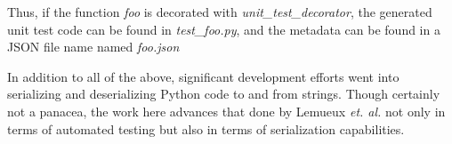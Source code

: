 Thus, if the function \textit{foo} is decorated with \textit{unit\_test\_decorator},
the generated unit test code can be found in \textit{test\_foo.py}, and the 
metadata can be found in a JSON file name named \textit{foo.json}

In addition to all of the above, significant development efforts went into 
serializing and deserializing Python code to and from strings.  Though
certainly not a panacea, the work here advances that done by 
Lemueux \textit{et. al.} \cite{lemieux2023codamosa} not only in terms of 
automated testing but also in terms of serialization capabilities.


